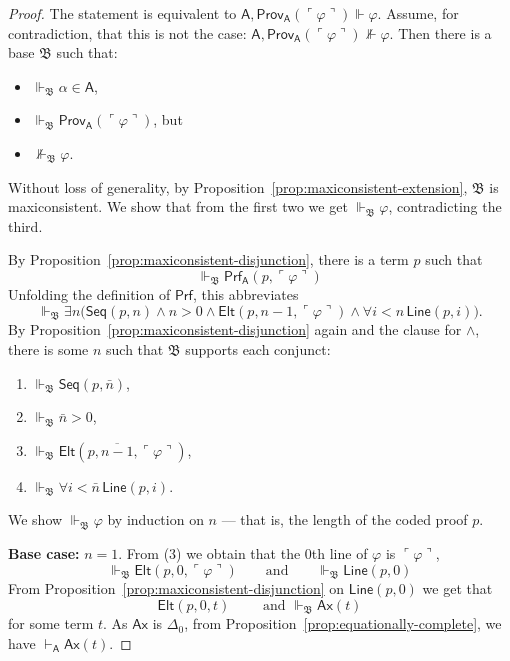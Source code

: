 \documentclass[10pt,a4paper]{amsart}
\newcommand{\Ax}{\textsf{Ax}}
\newcommand{\Elt}{\textsf{Elt}}
\newcommand{\Line}{\textsf{Line}}
\newcommand{\Prf}{\textsf{Prf}}
\newcommand{\Prov}{\textsf{Prov}}
\newcommand{\Seq}{\textsf{Seq}}
\newcommand{\base}[1]{\mathfrak{#1}}
\newcommand{\pa}{\textsf{A}}
\newcommand{\supp}{\Vdash}
\begin{document}
\begin{proof}
    The statement is equivalent to $\pa, \Prov_{\pa}(\ulcorner \varphi \urcorner) \supp \varphi$. Assume, for contradiction, that this is not the case: $\pa, \Prov_{\pa}(\ulcorner \varphi \urcorner) \not \supp \varphi$. Then there is a base $\base{B}$ such that:
    \begin{itemize}
        \item $\supp_{\base{B}} \alpha \in \pa$,
        \item $\supp_{\base{B}}  \Prov_{\pa}(\ulcorner \varphi \urcorner)$, but
        \item $\not \supp_{\base{B}} \varphi$.
    \end{itemize}
    Without loss of generality, by Proposition~\ref{prop:maxiconsistent-extension}, $\base{B}$ is maxiconsistent. We show that from the first two we get $\supp_{\base{B}} \varphi$, contradicting the third. \medskip

By Proposition~\ref{prop:maxiconsistent-disjunction}, there is a term $p$ such that 
\[
\supp_{\base{B}}  \Prf_{\pa}(p,\ulcorner \varphi \urcorner)
\]
Unfolding the definition of $\Prf$,
this abbreviates
\[
\supp_{\base{B}}\exists n\Big(
\Seq(p,n)\wedge n>0 \wedge \Elt(p,n-1,\ulcorner\varphi\urcorner)\wedge \forall i<n\,\Line(p,i)
\Big).
\]
By Proposition~\ref{prop:maxiconsistent-disjunction} again and the clause for $\land$, there is some $n$ such that
$\base{B}$ supports each conjunct:
\begin{enumerate}
\item $\supp_{\base{B}}\Seq(p,\bar n)$,
\item $\supp_{\base{B}}\bar n>0$,
\item $\supp_{\base{B}}\Elt(p,\overline{n-1},\ulcorner\varphi\urcorner)$,
\item $\supp_{\base{B}}\forall i<\bar n\,\Line(p,i)$.
\end{enumerate}

We show $\supp_{\base{B}}\varphi$ by induction on $n$ --- that is, the length of the coded proof $p$.

\smallskip
\noindent\textbf{Base case:} $n=1$. From (3) we obtain that the $0$th line of $\varphi$ is $\ulcorner \varphi \urcorner$,
\[
\supp_{\base{B}} \Elt(p,0,\ulcorner\varphi\urcorner) \qquad \text{and} \qquad \supp_{\base{B}} \Line(p,0)
\]
From Proposition~\ref{prop:maxiconsistent-disjunction} on $\Line(p,0)$ we get that 
\[
\Elt(p,0,t) \qquad \text{ and } \supp_{\base{B}} \Ax(t)
\]
for some term $t$. As $\Ax$ is $\Delta_0$, from Proposition~\ref{prop:equationally-complete}, we have $\vdash_{\pa} \Ax(t)$. 


\end{proof}
\end{document}
